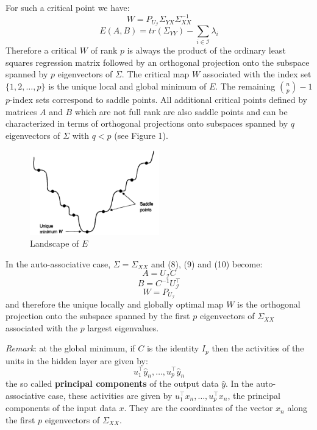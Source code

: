 For such a critical point we have:
\begin{equation} \tag{10}
    W = P_{U_\mathcal{I}}\Sigma_{YX}\Sigma_{XX}^{-1}
\end{equation}
\begin{equation} \tag{11}
    E(A,B) = tr(\Sigma_{YY}) - \sum_{i \in \mathcal{I}} \lambda_i
\end{equation}
Therefore a critical $W$ of rank $p$ is always the product of the ordinary least squares regression matrix followed by an orthogonal projection onto the subspace spanned by $p$ eigenvectors of $\Sigma$. The critical map $W$ associated with the index set $\{1,2,\dots, p\}$ is the unique local and global minimum of $E$. The remaining $\binom{n}{p} - 1$ $p$-index sets correspond to saddle points. All additional critical points defined by matrices $A$ and $B$ which are not full rank are also saddle points and can be characterized in terms of orthogonal projections onto subspaces spanned by $q$ eigenvectors of $\Sigma$ with $q < p$ (see Figure 1). 
\begin{figure}[H]
    \centering
    \includegraphics[width=0.5\textwidth]{./Images/LinearAutoenc_Saddles.png}
    \caption{Landscape of $E$}
    \end{figure}
In the auto-associative case, $\Sigma = \Sigma_{XX}$ and (8), (9) and (10) become:
\begin{equation} \tag{8'}
    A = U_{\mathcal{I}}C
\end{equation}
\begin{equation} \tag{9'}
    B = C^{-1}U_{\mathcal{I}}^\intercal
\end{equation}
\begin{equation} \tag{10'}
    W = P_{U_{\mathcal{I}}}
\end{equation}
and therefore the unique locally and globally optimal map $W$ is the orthogonal projection onto the subspace spanned by the first $p$ eigenvectors of $\Sigma_{XX}$ associated with the $p$ largest eigenvalues. 

\emph{Remark}: at the global minimum, if $C$ is the identity $I_p$ then the activities of the units in the hidden layer are given by:
\[
    u_1^\intercal \hat{y}_n , \dots , u_p^\intercal \hat{y}_n    
\]
the so called \textbf{principal components} of the output data $\hat{y}$. In the auto-associative case, these activities are given by $u_1^\intercal x_n, \dots, u_p^\intercal x_n$, the principal components of the input data $x$. They are the coordinates of the vector $x_n$ along the first $p$ eigenvectors of $\Sigma_{XX}$.




